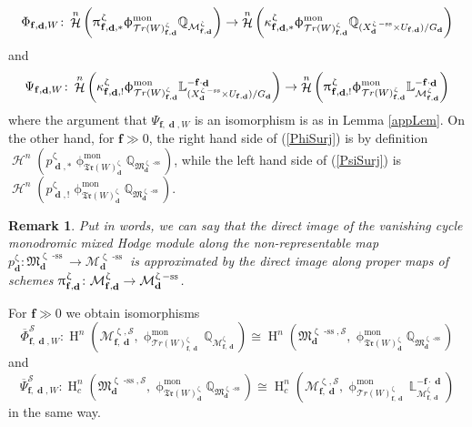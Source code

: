 \documentclass[a4paper,10pt]{amsart}
\renewcommand{\zeta}{\upzeta}
\renewcommand{\pi}{\uppi\hspace{0.05em}}
\renewcommand{\phi}{\upphi}
\newtheorem{remark}[theorem]{Remark}
\newcommand{\ff}{\mathbf{f}}
\newcommand{\SP}{\mathcal{S}}
\newcommand{\WW}{\mathcal{T}r(W)}
\newcommand{\WWW}{\mathfrak{Tr}(W)}
\newcommand{\Mst}{\mathfrak{M}}
\newcommand{\Msp}{\mathcal{M}}
\newcommand{\phim}[1]{\phi^{\mon}_{#1}}
\DeclareMathOperator{\sst}{-ss}
\DeclareMathOperator{\mon}{mon}
\DeclareMathOperator{\dd}{\mathbf{d}}
\DeclareMathOperator{\Ho}{\mathcal{H}}
\DeclareMathOperator{\HO}{H}
\begin{document}
\begin{equation}
\label{PhiSurj}
\Phi_{\ff,\dd,W}\colon \Ho^n\left(\pi _{\ff,\dd,*}^{\zeta}\phim{\WW_{\ff,\dd}^{\zeta}}\mathbb{Q}_{\Msp_{\ff,\dd}^{\zeta}}\right)\rightarrow \Ho^n\left(\kappa^{\zeta}_{\ff,\dd,*}\phim{\WW_{\ff,\dd}^{\zeta}}\mathbb{Q}_{(X_{\dd}^{\zeta\sst}\times U_{\ff,\dd })/G_{\dd}}\right)
\end{equation}
and 
\begin{equation}
\label{PsiSurj}
\Psi_{\ff,\dd ,W}\colon  \Ho^n\left(\kappa^{\zeta}_{\ff,\dd ,!}\phim{\WW_{\ff,\dd }^{\zeta}}\mathbb{L}^{-\ff\cdot \dd}_{(X_{\dd}^{\zeta\sst}\times U_{\ff,\dd })/G_{\dd}}\right)\rightarrow \Ho^n\left(\pi_{\ff,\dd ,!}^{\zeta}\phim{\WW_{\ff,\dd }^{\zeta}}\mathbb{L}^{-\ff\cdot\dd}_{\Msp_{\ff,\dd }^{\zeta}}\right)
\end{equation}
where the argument that $\Psi_{\ff,\dd ,W}$ is an isomorphism is as in Lemma \ref{appLem}.  On the other hand, for $\ff\gg 0$, the right hand side of (\ref{PhiSurj}) is by definition $\Ho^n(p_{\dd,*}^{\zeta}\phim{\WWW_{\dd}^{\zeta}}\mathbb{Q}_{\Mst^{\zeta\sst}_{\dd}})$, while the left hand side of (\ref{PsiSurj}) is $\Ho^n(p_{\dd,!}^{\zeta}\phim{\WWW_{\dd}^{\zeta}}\mathbb{Q}_{\Mst^{\zeta\sst}_{\dd}})$.  
\begin{remark}
Put in words, we can say that the direct image of the vanishing cycle monodromic mixed Hodge module along the non-representable map $p^{\zeta}_{\dd}\colon\Mst_{\dd}^{\zeta\sst}\rightarrow\Msp_{\dd}^{\zeta\sst}$ is approximated by the direct image along \textit{proper} maps of schemes $\pi _{\ff,\dd }^{\zeta}\colon \Msp_{\ff,\dd }^{\zeta}\rightarrow\Msp_{\dd}^{\zeta\sst}$.  
\end{remark}
For $\ff\gg 0$ we obtain isomorphisms
\begin{equation}
\label{PhiBar}
\overline{\Phi}^{\SP}_{\ff,\dd,W }\colon \HO^n(\Msp_{\ff,\dd }^{\zeta,\SP},\phim{\WW_{\ff,\dd }^{\zeta}}\mathbb{Q}_{\Msp_{\ff,\dd }^{\zeta}})\cong\HO^n(\Mst^{\zeta\sst,\SP}_{\dd},\phim{\WWW^{\zeta}_{\dd}}\mathbb{Q}_{\Mst^{\zeta\sst}_{\dd}})
\end{equation}
and
\begin{equation}
\label{PsiBar}
\overline{\Psi}^{\SP}_{\ff,\dd,W }\colon \HO^n_c(\Mst^{\zeta\sst,\SP}_{\dd},\phim{\WWW^{\zeta}_{\dd}}\mathbb{Q}_{\Mst^{\zeta\sst}_{\dd}})\cong \HO^n_c(\Msp_{\ff,\dd }^{\zeta,\SP},\phim{\WW^{\zeta}_{\ff,\dd }}\mathbb{L}^{-\ff\cdot \dd}_{\Msp_{\ff,\dd }^{\zeta}})
\end{equation}
in the same way.  
\end{document}
